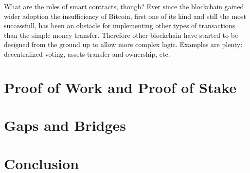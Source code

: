 \documentclass[a4paper,12pt,twoside]{book}
\begin{document}
    What are the roles of smart contracts, though? Ever since the blockchain gained wider adoption the insufficiency of Bitcoin, first one of its kind and still the most successfull, has been an obstacle for implementing other types of transactions than the simple money transfer. Therefore other blockchain have started to be designed from the ground up to allow more complex logic. Examples are plenty: decentralized voting, assets transfer and ownership, etc.

\section{Proof of Work and Proof of Stake}
\label{sec:PoWandPoS}


\section{Gaps and Bridges}
\label{sec:GapsBridges}

\section{Conclusion}
\label{sec:Conclusion}


\end{document}
